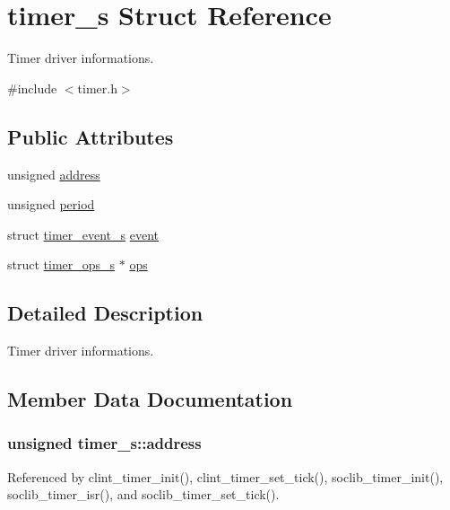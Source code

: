 \hypertarget{structtimer__s}{\section{timer\-\_\-s Struct Reference}
\label{structtimer__s}
}


Timer driver informations.  




{\ttfamily \#include $<$timer.\-h$>$}

\subsection*{Public Attributes}
\begin{DoxyCompactItemize}
\item 
unsigned \hyperlink{structtimer__s_a269237a7467e8d2423d548750a772631}{address}
\item 
unsigned \hyperlink{structtimer__s_a9174e40ce5a0ea4f7072968f377d27b5}{period}
\item 
struct \hyperlink{structtimer__event__s}{timer\-\_\-event\-\_\-s} \hyperlink{structtimer__s_ad65ea18f2fc79735a86d6ba118933f5b}{event}
\item 
struct \hyperlink{structtimer__ops__s}{timer\-\_\-ops\-\_\-s} $\ast$ \hyperlink{structtimer__s_a859db5220e0605eabaa9100121940b5e}{ops}
\end{DoxyCompactItemize}


\subsection{Detailed Description}
Timer driver informations. 

\subsection{Member Data Documentation}
\hypertarget{structtimer__s_a269237a7467e8d2423d548750a772631}{
\subsubsection[{address}]{\setlength{\rightskip}{0pt plus 5cm}unsigned timer\-\_\-s\-::address}}\label{structtimer__s_a269237a7467e8d2423d548750a772631}


Referenced by clint\-\_\-timer\-\_\-init(), clint\-\_\-timer\-\_\-set\-\_\-tick(), soclib\-\_\-timer\-\_\-init(), soclib\-\_\-timer\-\_\-isr(), and soclib\-\_\-timer\-\_\-set\-\_\-tick().

